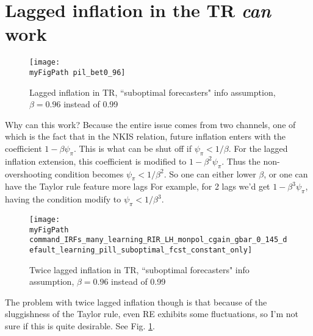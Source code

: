 \documentclass[11pt]{article}
\def \myFigPath {../figures/}
\renewcommand{\[}{\begin{equation}}
\renewcommand{\]}{\end{equation}}
\def\mySmallerFigScale{0.18}
\begin{document}
\section{Lagged inflation in the TR \emph{can} work}

\begin{figure}[h!]
\texttt{[image: \\myFigPath pil\_bet0\_96]}
\caption{ Lagged inflation in TR, ``suboptimal forecasters" info assumption, $\beta = 0.96$ instead of 0.99}
\end{figure}

Why can this work? Because the entire issue comes from two channels, one of which is the fact that in the NKIS relation, future inflation enters with the coefficient $1-\beta\psi_{\pi}$. This is what can be shut off if $\psi_{\pi} < 1/\beta$. For the lagged inflation extension, this coefficient is modified to $1-\beta^2\psi_{\pi}$. Thus the non-overshooting condition becomes $\psi_{\pi} < 1/\beta^2$. So one can either lower $\beta$, or one can have the Taylor rule feature more lags For example, for 2 lags we'd get $1-\beta^3\psi_{\pi}$, having the condition modify to  $\psi_{\pi} < 1/\beta^3$.

\begin{figure}[h!]
\texttt{[image: \\myFigPath command\_IRFs\_many\_learning\_RIR\_LH\_monpol\_cgain\_gbar\_0\_145\_default\_learning\_pill\_suboptimal\_fcst\_constant\_only]}
\caption{ Twice lagged inflation in TR, ``suboptimal forecasters" info assumption, $\beta = 0.96$ instead of 0.99}
\label{pill}
\end{figure}

The problem with twice lagged inflation though is that because of the sluggishness of the Taylor rule, even RE exhibits some fluctuations, so I'm not sure if this is quite desirable. See Fig. \ref{pill}.
\end{document}
